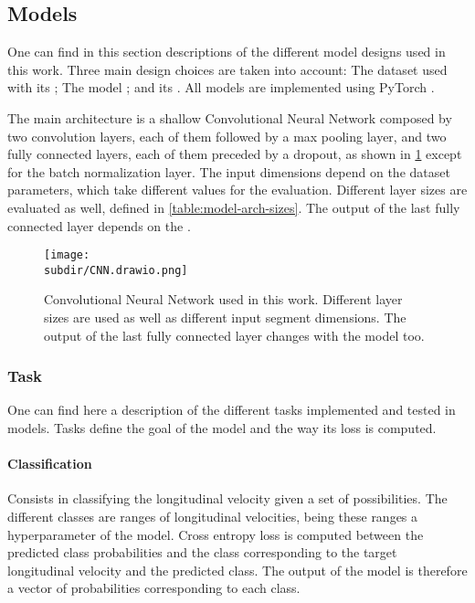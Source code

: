 \subsection{Models} \label{sec:models}

One can find in this section descriptions of the different model designs used
in this work. Three main design choices are taken into account: The dataset
used with its ; The model
; and its . All
models are implemented using PyTorch \cite{NEURIPS2019_9015}.

The main architecture is a shallow Convolutional Neural Network
\cite{FukushimaCNN} composed by two convolution layers, each of them followed
by a max pooling layer, and two fully connected layers, each of them preceded
by a dropout, as shown in \cref{fig:model-arch-cnn} except for the batch
normalization layer. The input dimensions depend on the dataset parameters,
which take different values for the evaluation. Different layer sizes are
evaluated as well, defined in \cref{table:model-arch-sizes}. The output of the
last fully connected layer depends on the .

\begin{figure}
    \centering
    \texttt{[image: \\subdir/CNN.drawio.png]}
    \caption[Model architecture]{Convolutional Neural Network
         used in this work. Different layer
        sizes are used as well as different input segment dimensions. The
        output of the last fully connected layer changes with the model
         too.}
    \label{fig:model-arch-cnn}
\end{figure}

\subsubsection{Task} \label{subsec:model-task}

One can find here a description of the different tasks implemented and tested
in models. Tasks define the goal of the model and the way its loss is computed.

\paragraph{Classification} \label{para:model-task-class} Consists in
classifying the longitudinal velocity given a set of possibilities. The
different classes are ranges of longitudinal velocities, being these ranges a
hyperparameter of the model. Cross entropy loss is computed between the
predicted class probabilities and the class corresponding to the target
longitudinal velocity and the predicted class. The output of the model is
therefore a vector of probabilities corresponding to each class.

